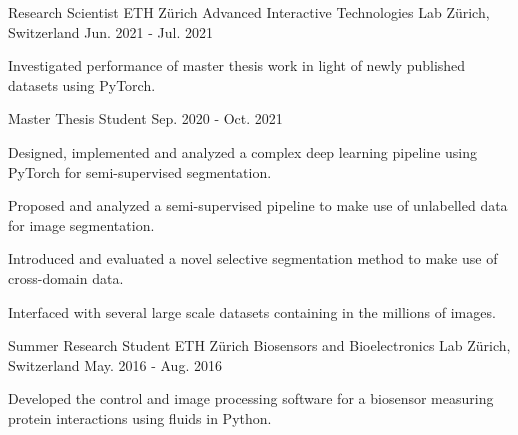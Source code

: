 

\begin{cventries}

  \cventry
    {Research Scientist} %
    {ETH Z\"urich Advanced Interactive Technologies Lab} %
    {Z\"urich, Switzerland} %
    {Jun. 2021 - Jul. 2021} %
    {
      \begin{cvitems} %
        \item {Investigated performance of master thesis work in light of newly published datasets using PyTorch.}
      \end{cvitems}
    }

\vspace*{-0.15cm}  
\cventry
    {Master Thesis Student} %
    {} %
    {} %
    {Sep. 2020 - Oct. 2021} %
    {
      \begin{cvitems} %
        \item {Designed, implemented and analyzed a complex deep learning pipeline using PyTorch for semi-supervised segmentation.}
        \item {Proposed and analyzed a semi-supervised pipeline to make use of unlabelled data for image segmentation.}
        \item {Introduced and evaluated a novel selective segmentation method to make use of cross-domain data.}
        \item {Interfaced with several large scale datasets containing in the millions of images.}
      \end{cvitems}
    }

  \cventry
  {Summer Research Student} %
  {ETH Z\"urich Biosensors and Bioelectronics Lab} %
  {Z\"urich, Switzerland} %
  {May. 2016 - Aug. 2016} %
  {
    \begin{cvitems} %
      \item {Developed the control and image processing software for a biosensor measuring protein interactions using fluids in Python.}
    \end{cvitems}
  }

\end{cventries}
